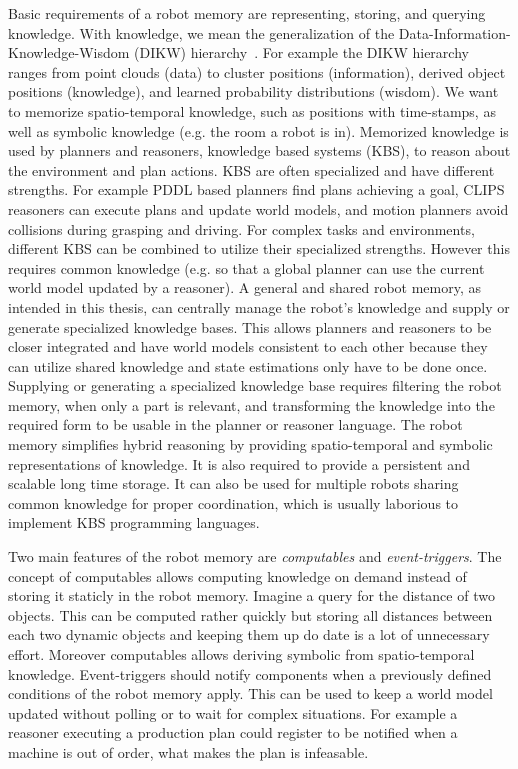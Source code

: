 \documentclass[a4paper,11pt]{article}
\begin{document}
Basic requirements of a robot memory are representing, storing,
and querying knowledge. With knowledge, we mean the generalization of
the Data-Information-Knowledge-Wisdom (DIKW)
hierarchy~\cite{DIKW}. For example the DIKW hierarchy ranges from
point clouds (data) to cluster positions (information), derived object
positions (knowledge), and learned probability distributions
(wisdom). We want to memorize spatio-temporal knowledge, such as
positions with time-stamps, as well as symbolic knowledge (e.g. the
room a robot is in). Memorized knowledge is used by planners and
reasoners, knowledge based systems (KBS), to reason about the
environment and plan actions. KBS are often specialized and have
different strengths. For example PDDL based planners find plans
achieving a goal, CLIPS reasoners can execute plans and update
world models, and motion planners avoid collisions during grasping and
driving. For complex tasks and environments, different KBS can be
combined to utilize their specialized strengths. However this requires
common knowledge (e.g. so that a global planner can use the current
world model updated by a reasoner).
%
A general and shared robot memory, as intended in this thesis, can
centrally manage the robot's knowledge and supply or generate
specialized knowledge bases. This allows planners and reasoners to be
closer integrated and have world models consistent to each other
because they can utilize shared knowledge and state estimations only
have to be done once. Supplying or generating a specialized knowledge
base requires filtering the robot memory, when only a part is
relevant, and transforming the knowledge into the required form to be
usable in the planner or reasoner language. The robot memory
simplifies hybrid reasoning by providing spatio-temporal and symbolic
representations of knowledge. It is also required to provide a
persistent and scalable long time storage.
%
It can also be used for multiple robots sharing common knowledge for
proper coordination, which is usually laborious to implement KBS
programming languages.

Two main features of the robot memory are \emph{computables} and
\emph{event-triggers}. The concept of computables allows computing
knowledge on demand instead of storing it staticly in the robot
memory. Imagine a query for the distance of two objects. This can be
computed rather quickly but storing all distances between each two
dynamic objects and keeping them up do date is a lot of unnecessary
effort. Moreover computables allows deriving symbolic from
spatio-temporal knowledge. Event-triggers should notify components
when a previously defined conditions of the robot memory apply. This
can be used to keep a world model updated without polling or to wait
for complex situations. For example a reasoner executing a production
plan could register to be notified when a machine is out of order,
what makes the plan is infeasable.
\end{document}
